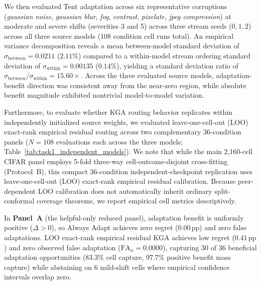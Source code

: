 We then evaluated Tent adaptation across six representative corruptions (\emph{gaussian noise}, \emph{gaussian blur}, \emph{fog}, \emph{contrast}, \emph{pixelate}, \emph{jpeg compression}) at moderate and severe shifts (severities 3 and 5) across three stream seeds ($0, 1, 2$) across all three source models (108 condition cell runs total). An empirical variance decomposition reveals a mean between-model standard deviation of $\sigma_{\mathrm{between}} = 0.0211$ ($2.11\%$) compared to a within-model stream ordering standard deviation of $\sigma_{\mathrm{within}} = 0.00135$ ($0.14\%$), yielding a standard deviation ratio of $\sigma_{\mathrm{between}} / \sigma_{\mathrm{within}} = 15.60\times$. Across the three evaluated source models, adaptation-benefit direction was consistent away from the near-zero region, while absolute benefit magnitude exhibited nontrivial model-to-model variation.

 Furthermore, to evaluate whether KGA routing behavior replicates within independently initialized source weights, we evaluated leave-one-cell-out (LOO) exact-rank empirical residual routing across two complementary 36-condition panels ($N=108$ evaluations each across the three models; Table~\ref{tab:task1_independent_models}). We note that while the main 2,160-cell CIFAR panel employs 5-fold three-way cell-outcome-disjoint cross-fitting (Protocol~B), this compact 36-condition independent-checkpoint replication uses leave-one-cell-out (LOO) exact-rank empirical residual calibration. Because peer-dependent LOO calibration does not automatically inherit ordinary split-conformal coverage theorems, we report empirical cell metrics descriptively.

In \textbf{Panel~A} (the helpful-only reduced panel), adaptation benefit is uniformly positive ($\Delta > 0$), so Always Adapt achieves zero regret ($0.00\,\text{pp}$) and zero false adaptations. LOO exact-rank empirical residual KGA achieves low regret ($0.41\,\text{pp}$) and zero observed false adaptation ($\mathrm{FA}_u = 0.0000$), capturing $30$ of $36$ beneficial adaptation opportunities ($83.3\%$ cell capture, $97.7\%$ positive benefit mass capture) while abstaining on $6$ mild-shift cells where empirical confidence intervals overlap zero. 


